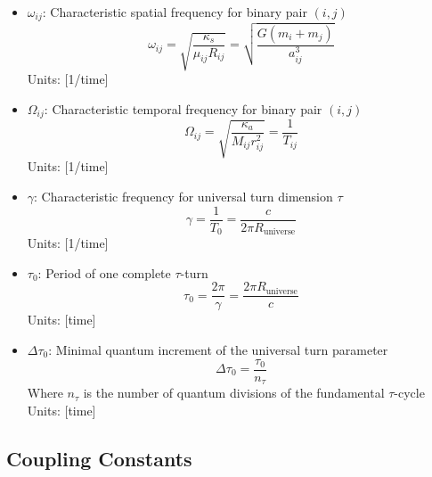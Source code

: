 \documentclass{article}
\begin{document}
\begin{itemize}
\item $\omega_{ij}$: Characteristic spatial frequency for binary pair $(i,j)$
    \begin{equation}
    \omega_{ij} = \sqrt{\frac{\kappa_s}{\mu_{ij} R_{ij}}} = \sqrt{\frac{G(m_i+m_j)}{a_{ij}^3}}
    \end{equation}
    Units: [1/time]
    
\item $\Omega_{ij}$: Characteristic temporal frequency for binary pair $(i,j)$
    \begin{equation}
    \Omega_{ij} = \sqrt{\frac{\kappa_a}{M_{ij} r_{ij}^2}} = \frac{1}{T_{ij}}
    \end{equation}
    Units: [1/time]
    
\item $\gamma$: Characteristic frequency for universal turn dimension $\tau$
    \begin{equation}
    \gamma = \frac{1}{T_0} = \frac{c}{2\pi R_{\text{universe}}}
    \end{equation}
    Units: [1/time]
    
\item $\tau_0$: Period of one complete $\tau$-turn
    \begin{equation}
    \tau_0 = \frac{2\pi}{\gamma} = \frac{2\pi R_{\text{universe}}}{c}
    \end{equation}
    Units: [time]
    
\item $\Delta\tau_0$: Minimal quantum increment of the universal turn parameter
    \begin{equation}
    \Delta\tau_0 = \frac{\tau_0}{n_\tau}
    \end{equation}
    Where $n_\tau$ is the number of quantum divisions of the fundamental $\tau$-cycle
    Units: [time]
\end{itemize}

\subsection{Coupling Constants}
\end{document}
